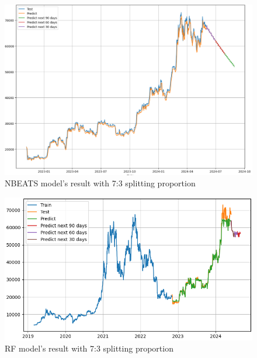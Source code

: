 \documentclass{ieeeojies}
\begin{document}
\begin{figure}[H]
	\centering
	\begin{minipage}{0.6\linewidth}
		\centering
		\includegraphics[width=\linewidth]{bibliography/Images/NBEATS_BTC_73.PNG}
		\caption{NBEATS model's result with 7:3 splitting proportion}
	\end{minipage}
\end{figure}
\begin{figure}[H]
	\centering
	\begin{minipage}{0.6\linewidth}
		\centering
		\includegraphics[width=\linewidth]{bibliography/Images/RF_BTC_73.PNG}
		\caption{RF model's result with 7:3 splitting proportion}
	\end{minipage}
\end{figure}
\end{document}
